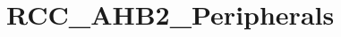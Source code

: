 \hypertarget{group___r_c_c___a_h_b2___peripherals}{\section{R\-C\-C\-\_\-\-A\-H\-B2\-\_\-\-Peripherals}
\label{group___r_c_c___a_h_b2___peripherals}
}

